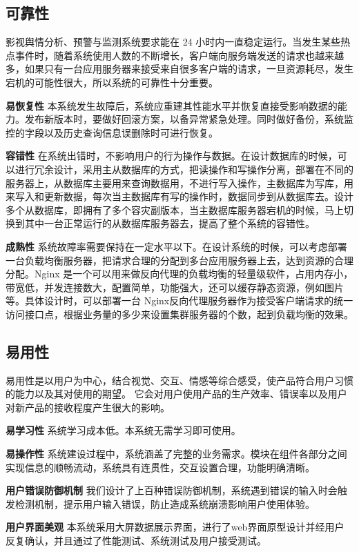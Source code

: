\subsection{可靠性}
影视舆情分析、预警与监测系统要求能在 24 小时内一直稳定运行。当发生某些热点事件时，随着系统使用人数的不断增长，客户端向服务端发送的请求也越来越多，如果只有一台应用服务器来接受来自很多客户端的请求，一旦资源耗尽，发生宕机的可能性很大，所以系统的可靠性十分重要。

\textbf{易恢复性}
本系统发生故障后，系统应重建其性能水平并恢复直接受影响数据的能力。发布新版本时，要做好回滚方案，以备异常紧急处理。同时做好备份，系统监控的字段以及历史查询信息误删除时可进行恢复。

\textbf{容错性}
在系统出错时，不影响用户的行为操作与数据。在设计数据库的时候，可以进行冗余设计，采用主从数据库的方式，把读操作和写操作分离，部署在不同的服务器上，从数据库主要用来查询数据用，不进行写入操作，主数据库为写库，用来写入和更新数据，每次当主数据库有写的操作时，数据同步到从数据库去。设计多个从数据库，即拥有了多个容灾副版本，当主数据库服务器宕机的时候，马上切换到其中一台正常运行的从数据库服务器去，提高了整个系统的容错性。

\textbf{成熟性}
系统故障率需要保持在一定水平以下。在设计系统的时候，可以考虑部署一台负载均衡服务器，把请求合理的分配到多台应用服务器上去，达到资源的合理分配。Nginx 是一个可以用来做反向代理的负载均衡的轻量级软件，占用内存小，带宽低，并发连接数大，配置简单，功能强大，还可以缓存静态资源，例如图片等。具体设计时，可以部署一台 Nginx反向代理服务器作为接受客户端请求的统一访问接口点，根据业务量的多少来设置集群服务器的个数，起到负载均衡的效果。

\subsection{易用性}
易用性是以用户为中心，结合视觉、交互、情感等综合感受，使产品符合用户习惯的能力以及其对使用的期望。 它会对用户使用产品的生产效率、错误率以及用户对新产品的接收程度产生很大的影响。

\textbf{易学习性}
系统学习成本低。本系统无需学习即可使用。

\textbf{易操作性}
系统建设过程中，系统涵盖了完整的业务需求。模块在组件各部分之间实现信息的顺畅流动，系统具有连贯性，交互设置合理，功能明确清晰。

\textbf{用户错误防御机制}
我们设计了上百种错误防御机制，系统遇到错误的输入时会触发检测机制，提示用户输入错误，防止造成系统崩溃影响用户使用体验。

\textbf{用户界面美观}
本系统采用大屏数据展示界面，进行了web界面原型设计并经用户反复确认，并且通过了性能测试、系统测试及用户接受测试。


